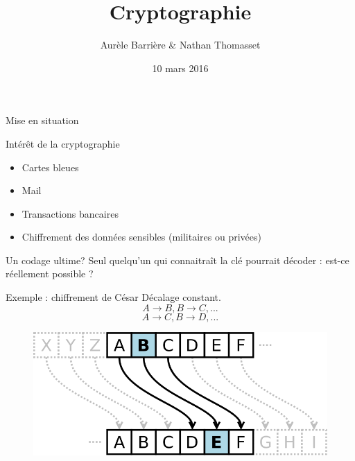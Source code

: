 \documentclass{beamer}
\author{Aurèle Barrière \& Nathan Thomasset}
\title{Cryptographie}
\date{10 mars 2016}
\begin{document}
\begin{frame}
\maketitle
\end{frame}

\begin{frame}{Mise en situation}
  \end{frame}

\begin{frame}{Intérêt de la cryptographie}
  \begin{itemize}
  \item Cartes bleues
    
  \item Mail
    
  \item Transactions bancaires
  
  \item Chiffrement des données sensibles (militaires ou privées)
\end{itemize}
\end{frame}

\begin{frame}{Un codage ultime?}
  Seul quelqu'un qui connaitraît la clé pourrait décoder : est-ce réellement possible ?
  \end{frame}

\begin{frame}{Exemple : chiffrement de César}
  Décalage constant. 
$$A\rightarrow B, B\rightarrow C, \text{...}$$ 
$$A\rightarrow C, B\rightarrow D, \text{...}$$

  \begin{figure}
    \centering
  \includegraphics[scale = 0.25]{cesar.png}
\end{figure}
\end{frame}
\end{document}
